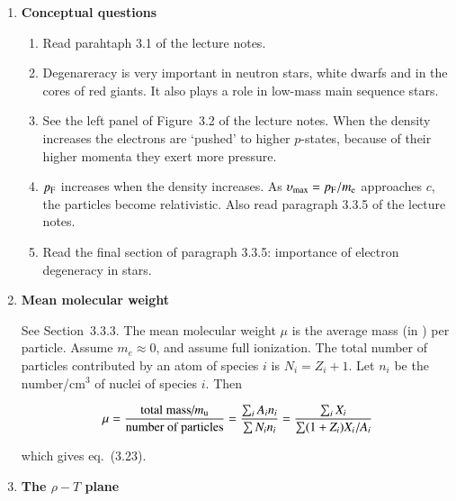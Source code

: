 \documentclass[11pt,a4paper]{report}
\begin{document}

\begin{enumerate}

\item {\bf Conceptual questions}

  \begin{enumerate}

  \item

    Read parahtaph 3.1 of the lecture notes.
    
  \item 

    Degenareracy is very important in neutron stars, white dwarfs and
    in the cores of red giants. It also plays a role in low-mass main
    sequence stars.

  \item

    See the left panel of Figure~3.2 of the lecture notes. When the
    density increases the electrons are `pushed' to higher $p$-states,
    because of their higher momenta they exert more pressure.

    
  \item

    $p_{\rm F}$ increases when the density increases.  As ${\upsilon}_{\max}
    = p_{\rm F}/m_{\rm e}$ approaches $c$, the particles become
    relativistic. Also read paragraph 3.3.5 of the lecture notes.

  \item

    Read the final section of paragraph 3.3.5: importance of electron
    degeneracy in stars.
    
  \end{enumerate}

\item {\bf Mean molecular weight} 

  See Section~3.3.3.  The mean molecular weight $\mu$ is the average
  mass (in \amu) per particle. Assume $m_e \approx 0$, and assume full
  ionization. The total number of particles contributed by an atom of
  species $i$ is $N_i = Z_i + 1$. Let $n_i$ be the number/cm$^3$ of
  nuclei of species $i$. Then

  \[
  \mu = \frac{\text{total mass/\ensuremath{m_\mathrm{u}}}}{\text{number of particles}} =
  \frac{\sum_i A_i n_i}{\sum N_i n_i} = \frac{\sum_i X_i}{\sum (1+Z_i)
    X_i/A_i}
  \]

  which gives eq.~(3.23).

\item  {\bf The {\boldmath$\rho-T$} plane }


\end{enumerate}
\end{document}
